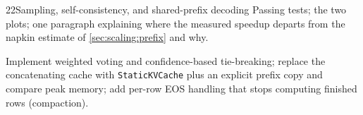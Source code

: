 \begin{labbox}{22}{Sampling, self-consistency, and shared-prefix decoding}
Passing tests; the two plots; one paragraph explaining where the measured speedup departs from the
napkin estimate of \cref{sec:scaling:prefix} and why.

Implement weighted voting and confidence-based tie-breaking; replace the concatenating cache with
\texttt{StaticKVCache} plus an explicit prefix copy and compare peak memory; add per-row EOS handling
that stops computing finished rows (compaction).
\end{labbox}
